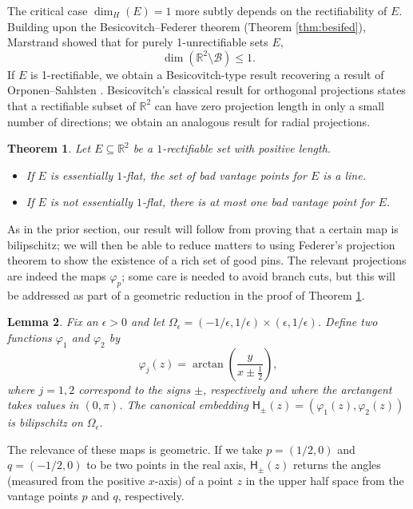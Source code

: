 \documentclass[12pt]{amsart}
\newtheorem{theorem}{Theorem}[section]
\newtheorem{lemma}[theorem]{Lemma}
\theoremstyle{definition}
\numberwithin{equation}{section}
\newcommand{\R}{\mathbb{R}}
\begin{document}
The critical case $\dim_H(E) = 1$ more subtly depends on the rectifiability of $E$.
Building upon the Besicovitch--Federer theorem (Theorem \ref{thm:besifed}), Marstrand \cite{Marstrand1987} showed that for purely 1-unrectifiable sets $E$,
\[
\dim (\R^2 \setminus \mathcal B) \leq 1.
\]
If $E$ is 1-rectifiable, we obtain a Besicovitch-type result recovering a result of Orponen--Sahlsten \cite{OS2011}. Besicovitch's classical result for orthogonal projections states that a rectifiable subset of $\mathbb{R}^2$ can have zero projection length in only a small number of directions; we obtain an analogous result for radial projections.

\begin{theorem}\label{thm:main_radial_projections}
Let $E \subseteq\mathbb{R}^2$ be a $1$-rectifiable set with positive length.
\begin{itemize}
    \item If $E$ is essentially $1$-flat, the set of bad vantage points for $E$ is a line.
    \item If $E$ is not essentially $1$-flat, there is at most one bad vantage point for $E$.
\end{itemize}
\end{theorem}

As in the prior section, our result will follow from proving that a certain map is bilipschitz; we will then be able to reduce matters to using Federer's projection theorem to show the existence of a rich set of good pins. The relevant projections are indeed the maps $\varphi_p$; some care is needed to avoid branch cuts, but this will be addressed as part of a geometric reduction in the proof of Theorem \ref{thm:main_radial_projections}.

\begin{lemma}\label{lemma:lemma:radial_projection_canonical_embedding}
Fix an $\epsilon > 0$ and let $\Omega_{\epsilon} = (-1/\epsilon, 1/\epsilon) \times (\epsilon, 1/\epsilon)$. Define two functions $\varphi_1$ and $\varphi_2$ by 
$$\varphi_j(z) = \arctan \left(\frac{y}{x \pm \frac 1 2}\right),$$
where $j = 1, 2$ correspond to the signs $\pm$, respectively and where the arctangent takes values in $(0, \pi)$. The canonical embedding $\mathsf{H}_{\pm}(z) = (\varphi_1(z), \varphi_2(z))$ is bilipschitz on $\Omega_{\epsilon}$.
\end{lemma}

The relevance of these maps is geometric. If we take $p = (1/2, 0)$ and $q = (-1/2, 0)$ to be two points in the real axis, $\mathsf{H}_\pm(z)$ returns the angles (measured from the positive $x$-axis) of a point $z$ in the upper half space from the vantage points $p$ and $q$, respectively.
\end{document}
